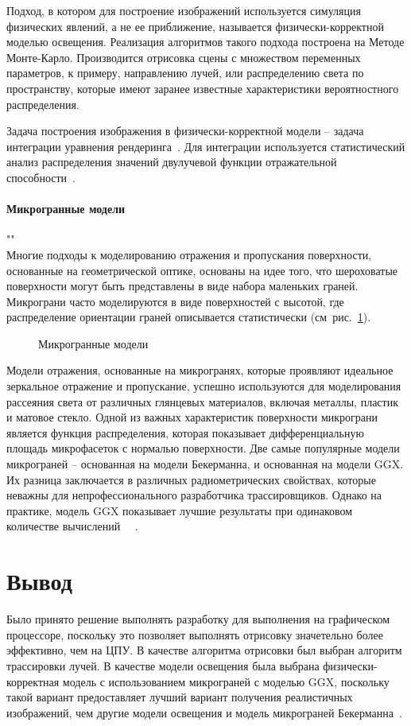 Подход, в котором для построение изображений используется симуляция физических 
явлений, а не ее приближение, называется физически-корректной моделью освещения.
Реализация алгоритмов такого подхода построена на Методе Монте-Карло. Производится
отрисовка сцены с множеством переменных параметров, к примеру, направлению лучей,
или распределению света по пространству, которые имеют заранее известные 
характеристики вероятностного распределения.

Задача построения изображения в физически-корректной модели -- задача 
интеграции уравнения рендеринга~\cite{EoR}. Для интеграции используется
статистический анализ распределения значений двулучевой функции отражательной 
способности~\cite{PBRT3e}.

\paragraph{Микрогранные модели}""\\
Многие подходы к моделированию отражения и пропускания поверхности, основанные 
на геометрической оптике, основаны на идее того, что шероховатые поверхности 
могут быть представлены в виде набора маленьких граней. Микрограни часто моделируются 
в виде поверхностей с высотой, где распределение ориентации граней описывается статистически 
(см~рис.~\ref{img:microfacet}).

\begin{figure}[!ht]
  \centering
  
  \caption{Микрогранные модели}
  \label{img:microfacet}
\end{figure}

Модели отражения, основанные на микрогранях, которые проявляют идеальное 
зеркальное отражение и пропускание, успешно используются для моделирования 
рассеяния света от различных глянцевых материалов, включая металлы, пластик 
и матовое стекло.
Одной из важных характеристик поверхности микрограни является функция 
распределения, которая показывает дифференциальную площадь микрофасеток 
с нормалью поверхности. Две самые популярные модели микрограней -- 
основанная на модели Бекерманна, и основанная на модели GGX. Их разница 
заключается в различных радиометрических свойствах, которые неважны
для непрофессионального разработчика трассировщиков. Однако на практике,
модель GGX показывает лучшие результаты при одинаковом количестве вычислений
~\cite{PBRT3e}~\cite{MMfRtRS}.

\section{Вывод}

Было принято решение выполнять разработку для выполнения на графическом процессоре,
поскольку это позволяет выполнять отрисовку значетельно более эффективно, чем на ЦПУ.
В качестве алгоритма отрисовки был выбран алгоритм трассировки лучей.
В качестве модели освещения была выбрана физически-корректная модель с использованием
микрограней с моделью GGX, поскольку такой вариант предоставляет лучший вариант
получения реалистичных изображений, чем другие модели освещения и модель микрограней Бекерманна~\cite{MMfRtRS}.

